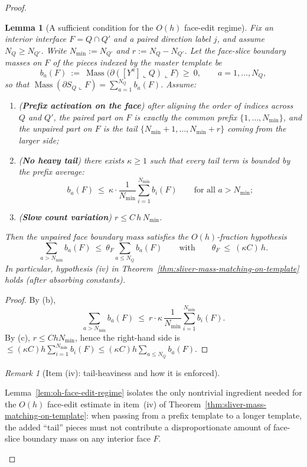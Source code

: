 \documentclass[11pt]{article}
\numberwithin{equation}{section}  %
\theoremstyle{plain}
\newtheorem{lemma}[theorem]{Lemma}
\theoremstyle{definition}
\theoremstyle{remark}
\newtheorem{remark}[theorem]{Remark}
\DeclareMathOperator{\Mass}{Mass}
\begin{document}
\begin{proof}
\begin{lemma}[A sufficient condition for the $O(h)$ face-edit regime]
Fix an interior interface $F=Q\cap Q'$ and a paired direction label $j$, and assume $N_Q\ge N_{Q'}$.
Write $N_{\min}:=N_{Q'}$ and $r:=N_Q-N_{Q'}$.
Let the face-slice boundary masses on $F$ of the pieces indexed by the master template be
\[
b_a(F)\ :=\ \Mass\!\big(\partial([Y^a]\llcorner Q)\llcorner F\big)\ \ge\ 0,
\qquad a=1,\dots,N_Q,
\]
so that $\Mass(\partial S_Q\llcorner F)=\sum_{a=1}^{N_Q} b_a(F)$.
Assume:
\begin{enumerate}
\item[\textnormal{(a)}] (\textbf{Prefix activation on the face}) after aligning the order of indices across $Q$ and $Q'$,
the paired part on $F$ is exactly the common prefix $\{1,\dots,N_{\min}\}$, and the unpaired part on $F$ is the tail
$\{N_{\min}+1,\dots,N_{\min}+r\}$ coming from the larger side;
\item[\textnormal{(b)}] (\textbf{No heavy tail}) there exists $\kappa\ge 1$ such that every tail term is bounded by the prefix average:
\[
b_{a}(F)\ \le\ \kappa\cdot \frac{1}{N_{\min}}\sum_{i=1}^{N_{\min}} b_i(F)
\qquad\text{for all }a>N_{\min};
\]
\item[\textnormal{(c)}] (\textbf{Slow count variation}) $r\le C\,h\,N_{\min}$.
\end{enumerate}
Then the unpaired face boundary mass satisfies the $O(h)$-fraction hypothesis
\[
\sum_{a>N_{\min}} b_a(F)\ \le\ \theta_F\sum_{a\le N_Q} b_a(F)
\qquad\text{with}\qquad \theta_F\ \le\ (\kappa C)\,h.
\]
In particular, hypothesis (iv) in Theorem~\ref{thm:sliver-mass-matching-on-template} holds (after absorbing constants).

\end{lemma}

\begin{proof}
By (b),
\[
\sum_{a>N_{\min}} b_a(F)\ \le\ r\cdot \kappa\,\frac{1}{N_{\min}}\sum_{i=1}^{N_{\min}} b_i(F).
\]
By (c), $r\le C h N_{\min}$, hence the right-hand side is $\le (\kappa C)h \sum_{i=1}^{N_{\min}} b_i(F)\le (\kappa C)h \sum_{a\le N_Q} b_a(F)$.
\end{proof}

\begin{remark}[Item \textnormal{(iv)}: tail-heaviness and how it is enforced]\label{rem:iv-what-remains}

Lemma~\ref{lem:oh-face-edit-regime} isolates the only nontrivial ingredient needed for the $O(h)$ face-edit estimate in item~\textnormal{(iv)} of Theorem~\ref{thm:sliver-mass-matching-on-template}: when passing from a prefix template to a longer template, the added ``tail'' pieces must not contribute a disproportionate amount of face-slice boundary mass on any interior face $F$.


\end{remark}
\end{proof}
\end{document}
